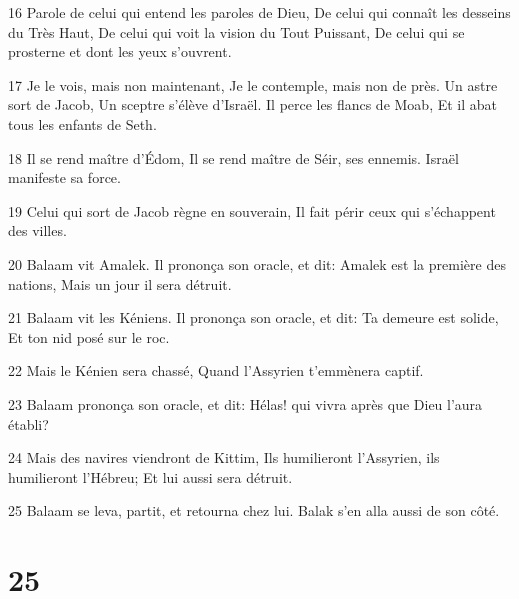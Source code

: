 \par 16 Parole de celui qui entend les paroles de Dieu, De celui qui connaît les desseins du Très Haut, De celui qui voit la vision du Tout Puissant, De celui qui se prosterne et dont les yeux s'ouvrent.
\par 17 Je le vois, mais non maintenant, Je le contemple, mais non de près. Un astre sort de Jacob, Un sceptre s'élève d'Israël. Il perce les flancs de Moab, Et il abat tous les enfants de Seth.
\par 18 Il se rend maître d'Édom, Il se rend maître de Séir, ses ennemis. Israël manifeste sa force.
\par 19 Celui qui sort de Jacob règne en souverain, Il fait périr ceux qui s'échappent des villes.
\par 20 Balaam vit Amalek. Il prononça son oracle, et dit: Amalek est la première des nations, Mais un jour il sera détruit.
\par 21 Balaam vit les Kéniens. Il prononça son oracle, et dit: Ta demeure est solide, Et ton nid posé sur le roc.
\par 22 Mais le Kénien sera chassé, Quand l'Assyrien t'emmènera captif.
\par 23 Balaam prononça son oracle, et dit: Hélas! qui vivra après que Dieu l'aura établi?
\par 24 Mais des navires viendront de Kittim, Ils humilieront l'Assyrien, ils humilieront l'Hébreu; Et lui aussi sera détruit.
\par 25 Balaam se leva, partit, et retourna chez lui. Balak s'en alla aussi de son côté.

\chapter{25}


